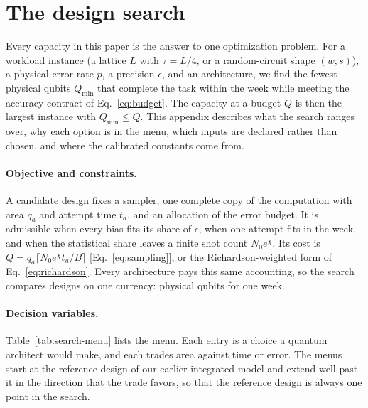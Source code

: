 \documentclass[11pt]{article}
\newcommand{\eps}{\epsilon}
\begin{document}
\section{The design search}\label{app:search}
Every capacity in this paper is the answer to one optimization problem. For a
workload instance (a lattice $L$ with $\tau=L/4$, or a random-circuit shape $(w,s)$),
a physical error rate $p$, a precision $\eps$, and an architecture, we find the
fewest physical qubits $Q_{\min}$ that complete the task within the week while
meeting the accuracy contract of Eq.~\eqref{eq:budget}. The capacity at a budget
$Q$ is then the largest instance with $Q_{\min}\leq Q$. This appendix describes what
the search ranges over, why each option is in the menu, which inputs are
declared rather than chosen, and where the calibrated constants come from.

\paragraph{Objective and constraints.} A candidate design fixes a sampler, one
complete copy of the computation with area $q_a$ and attempt time $t_a$, and an
allocation of the error budget. It is admissible when every bias fits its share
of $\eps$, when one attempt fits in the week, and when the statistical share
leaves a finite shot count $N_0e^{\chi}$. Its cost is
$Q=q_a\lceil N_0e^{\chi}t_a/B\rceil$ [Eq.~\eqref{eq:sampling}], or the
Richardson-weighted form of Eq.~\eqref{eq:richardson}. Every architecture pays
this same accounting, so the search compares designs on one currency: physical
qubits for one week.

\paragraph{Decision variables.} Table~\ref{tab:search-menu} lists the menu. Each
entry is a choice a quantum architect would make, and each trades area against
time or error. The menus start at the reference design of our earlier
integrated model and extend well past it in the direction that the trade
favors, so that the reference design is always one point in the search.
\end{document}

